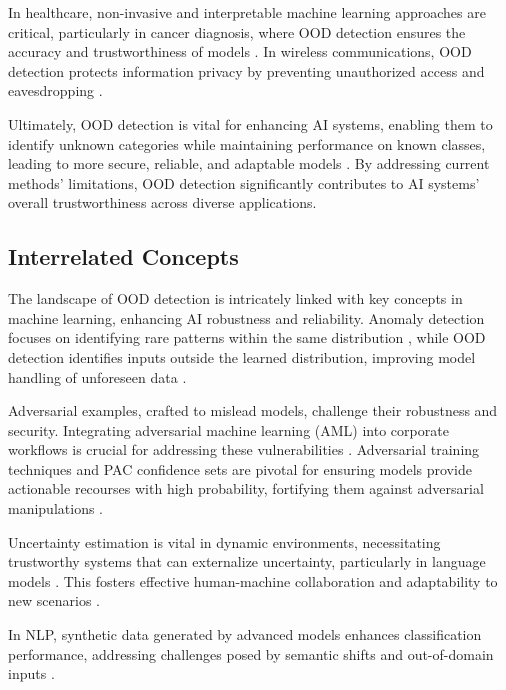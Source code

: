 In healthcare, non-invasive and interpretable machine learning approaches are critical, particularly in cancer diagnosis, where OOD detection ensures the accuracy and trustworthiness of models \cite{an2023intelligentdiagnosticschemelung}. In wireless communications, OOD detection protects information privacy by preventing unauthorized access and eavesdropping \cite{kim2020make5gcommunicationsinvisible}.

Ultimately, OOD detection is vital for enhancing AI systems, enabling them to identify unknown categories while maintaining performance on known classes, leading to more secure, reliable, and adaptable models \cite{lang2023survey,Delvingint2}. By addressing current methods' limitations, OOD detection significantly contributes to AI systems' overall trustworthiness across diverse applications.

\subsection{Interrelated Concepts} \label{subsec:Interrelated Concepts}

The landscape of OOD detection is intricately linked with key concepts in machine learning, enhancing AI robustness and reliability. Anomaly detection focuses on identifying rare patterns within the same distribution \cite{lang2023survey}, while OOD detection identifies inputs outside the learned distribution, improving model handling of unforeseen data \cite{Out-of-Dis1}.

Adversarial examples, crafted to mislead models, challenge their robustness and security. Integrating adversarial machine learning (AML) into corporate workflows is crucial for addressing these vulnerabilities \cite{kim2020make5gcommunicationsinvisible}. Adversarial training techniques and PAC confidence sets are pivotal for ensuring models provide actionable recourses with high probability, fortifying them against adversarial manipulations \cite{cao2021understandingsecuritydeepfakedetection}.

Uncertainty estimation is vital in dynamic environments, necessitating trustworthy systems that can externalize uncertainty, particularly in language models \cite{islam2023distinguishinghumangeneratedtext}. This fosters effective human-machine collaboration and adaptability to new scenarios \cite{Delvingint2}.

In NLP, synthetic data generated by advanced models enhances classification performance, addressing challenges posed by semantic shifts and out-of-domain inputs \cite{lang2023survey}. 

